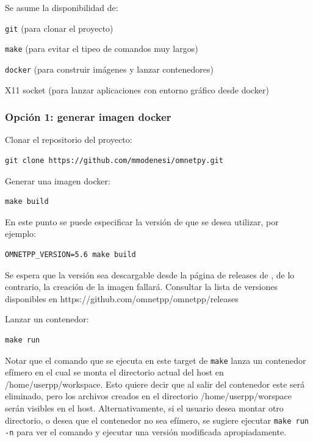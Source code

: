 \documentclass[]{article}
\begin{document}
Se asume la disponibilidad de:

\verb!git! (para clonar el proyecto)

\verb!make! (para evitar el tipeo de comandos muy largos)

\verb!docker! (para construir imágenes y lanzar contenedores)

X11 socket (para lanzar aplicaciones con entorno gráfico desde docker)

\subsubsection{Opción 1: generar imagen docker}

Clonar el repositorio del proyecto:

\begin{verbatim}
git clone https://github.com/mmodenesi/omnetpy.git
\end{verbatim}

Generar una imagen docker:

\begin{verbatim}
make build
\end{verbatim}

En este punto se puede especificar la versión de \omnetpp{} que se desea utilizar, por ejemplo:

\begin{verbatim}
OMNETPP_VERSION=5.6 make build
\end{verbatim}

Se espera que la versión sea descargable desde la página de releases de
\omnetpp{}, de lo contrario, la creación de la imagen fallará. Consultar la lista
de versiones disponibles en https://github.com/omnetpp/omnetpp/releases

Lanzar un contenedor:

\begin{verbatim}
make run
\end{verbatim}

Notar que el comando que se ejecuta en este target de \verb!make! lanza un
contenedor efímero en el cual se monta el directorio actual del host en
/home/userpp/workspace. Esto quiere decir que al salir del contenedor este será
eliminado, pero los archivos creados en el directorio /home/userpp/worspace
serán visibles en el host. Alternativamente, si el usuario desea montar otro
directorio, o desea que el contenedor no sea efímero, se sugiere ejecutar
\verb!make run -n! para ver el comando y ejecutar una versión modificada
apropiadamente.
\end{document}
